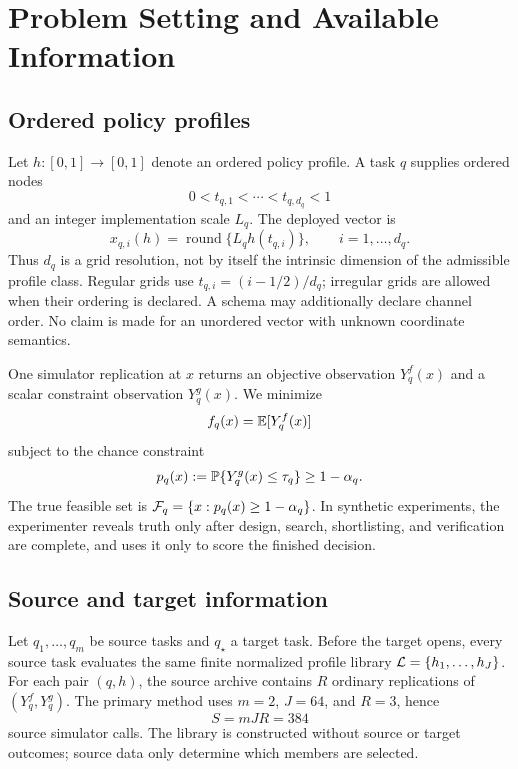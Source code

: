 \section{Problem Setting and Available Information}\label{sec:problem}

\subsection{Ordered policy profiles}

Let $h:[0,1]\to[0,1]$ denote an ordered policy profile.  A task $q$ supplies
ordered nodes
\[
  0<t_{q,1}<\cdots<t_{q,d_q}<1
\]
and an integer implementation scale $L_q$.  The deployed vector is
\[
  x_{q,i}(h)=\operatorname{round}\{L_qh(t_{q,i})\},
  \qquad i=1,\ldots,d_q.
\]
Thus $d_q$ is a grid resolution, not by itself the intrinsic dimension of the
admissible profile class.  Regular grids use
$t_{q,i}=(i-1/2)/d_q$; irregular grids are allowed when their ordering is
declared.  A schema may additionally declare channel order.  No claim is made
for an unordered vector with unknown coordinate semantics.

One simulator replication at $x$ returns an objective observation $Y^f_q(x)$
and a scalar constraint observation $Y^g_q(x)$.  We minimize
\[
  f_q(x)=\mathbb{E}[Y^f_q(x)]
\]
subject to the chance constraint
\begin{equation}\label{eq:chance-constraint}
  p_q(x):=\mathbb{P}\{Y^g_q(x)\le \tau_q\}\ge 1-\alpha_q.
\end{equation}
The true feasible set is $\mathcal{F}_q=\{x:p_q(x)\ge1-\alpha_q\}$.
In synthetic experiments, the experimenter reveals truth only after design,
search, shortlisting, and verification are complete, and uses it only to score
the finished decision.

\subsection{Source and target information}

Let $q_1,\ldots,q_m$ be source tasks and $q_\star$ a target task.  Before the
target opens, every source task evaluates the same finite normalized profile
library $\mathcal{L}=\{h_1,\ldots,h_J\}$.  For each pair $(q,h)$, the source archive
contains $R$ ordinary replications of $(Y^f_q,Y^g_q)$.  The primary method uses
$m=2$, $J=64$, and $R=3$, hence
\begin{equation}\label{eq:source-cost}
  S=mJR=384
\end{equation}
source simulator calls.  The library is constructed without source or target
outcomes; source data only determine which members are selected.

